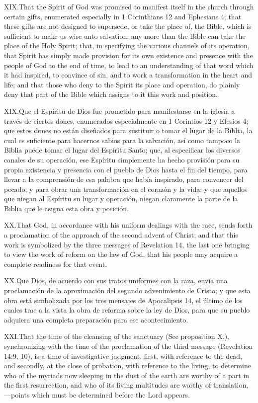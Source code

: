 \lettrine{XIX.} That the Spirit of God was promised to manifest itself in the church through certain gifts, enumerated especially in 1 Corinthians 12 and Ephesians 4; that these gifts are not designed to supersede, or take the place of, the Bible, which is sufficient to make us wise unto salvation, any more than the Bible can take the place of the Holy Spirit; that, in specifying the various channels of its operation, that Spirit has simply made provision for its own existence and presence with the people of God to the end of time, to lead to an understanding of that word which it had inspired, to convince of sin, and to work a transformation in the heart and life; and that those who deny to the Spirit its place and operation, do plainly deny that part of the Bible which assigns to it this work and position.


\lettrine{XIX.} Que el Espíritu de Dios fue prometido para manifestarse en la iglesia a través de ciertos dones, enumerados especialmente en 1 Corintios 12 y Efesios 4; que estos dones no están diseñados para sustituir o tomar el lugar de la Biblia, la cual es suficiente para hacernos sabios para la salvación, así como tampoco la Biblia puede tomar el lugar del Espíritu Santo; que, al especificar los diversos canales de su operación, ese Espíritu simplemente ha hecho provisión para su propia existencia y presencia con el pueblo de Dios hasta el fin del tiempo, para llevar a la comprensión de esa palabra que había inspirado, para convencer del pecado, y para obrar una transformación en el corazón y la vida; y que aquellos que niegan al Espíritu su lugar y operación, niegan claramente la parte de la Biblia que le asigna esta obra y posición.


\lettrine{XX.} That God, in accordance with his uniform dealings with the race, sends forth a proclamation of the approach of the second advent of Christ; and that this work is symbolized by the three messages of Revelation 14, the last one bringing to view the work of reform on the law of God, that his people may acquire a complete readiness for that event.


\lettrine{XX.} Que Dios, de acuerdo con sus tratos uniformes con la raza, envía una proclamación de la aproximación del segundo advenimiento de Cristo; y que esta obra está simbolizada por los tres mensajes de Apocalipsis 14, el último de los cuales trae a la vista la obra de reforma sobre la ley de Dios, para que su pueblo adquiera una completa preparación para ese acontecimiento.


\lettrine{XXI.} That the time of the cleansing of the sanctuary (See proposition X.), synchronizing with the time of the proclamation of the third message (Revelation 14:9, 10), is a time of investigative judgment, first, with reference to the dead, and secondly, at the close of probation, with reference to the living, to determine who of the myriads now sleeping in the dust of the earth are worthy of a part in the first resurrection, and who of its living multitudes are worthy of translation,—points which must be determined before the Lord appears.


